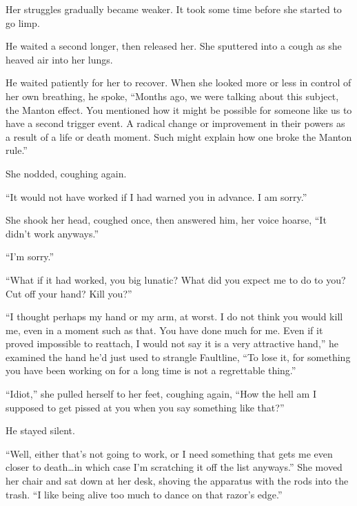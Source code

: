 Her struggles gradually became weaker.  It took some time before she started to go limp.



He waited a second longer, then released her.  She sputtered into a cough as she heaved air into her lungs.



He waited patiently for her to recover.  When she looked more or less in control of her own breathing, he spoke, ``Months ago, we were talking about this subject, the Manton effect.  You mentioned how it might be possible for someone like us to have a second trigger event.  A radical change or improvement in their powers as a result of a life or death moment.  Such might explain how one broke the Manton rule.''



She nodded, coughing again.



``It would not have worked if I had warned you in advance.  I am sorry.''



She shook her head, coughed once, then answered him, her voice hoarse, ``It didn't work anyways.''



``I'm sorry.''



``What if it had worked, you big lunatic?  What did you expect me to do to you?  Cut off your hand?  Kill you?''



``I thought perhaps my hand or my arm, at worst.  I do not think you would kill me, even in a moment such as that.  You have done much for me.  Even if it proved impossible to reattach, I would not say it is a very attractive hand,'' he examined the hand he'd just used to strangle Faultline, ``To lose it, for something you have been working on for a long time is not a regrettable thing.''



``Idiot,'' she pulled herself to her feet, coughing again, ``How the hell am I supposed to get pissed at you when you say something like that?''



He stayed silent.



``Well, either that's not going to work, or I need something that gets me even closer to death\ldots in which case I'm scratching it off the list anyways.'' She moved her chair and sat down at her desk, shoving the apparatus with the rods into the trash.  ``I like being alive too much to dance on that razor's edge.''



